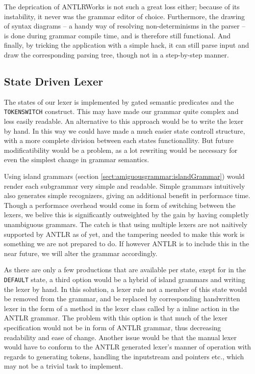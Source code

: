 The deprication of ANTLRWorks is not such a great loss either; because of its instability, it never was the grammar editor of choice. Furthermore, the drawing of syntax diagrams -- a handy way of resolving non-determinisms in the parser -- is done during grammar compile time, and is therefore still functional. And finally, by tricking the application with a simple hack, it can still parse input and draw the corresponding parsing tree, though not in a step-by-step manner.

\subsection{State Driven Lexer}

The states of our lexer is implemented by gated semantic predicates and the \verb!TOKENSWITCH! construct. This may have made our grammar quite complex and less easily readable. An alternative to this approach would be to write the lexer by hand. In this way we could have made a much easier state controll structure, with a more complete division between each states functionallity. But future modificatibility would be a problem, as a lot rewriting would be necessary for even the simplest change in grammar semantics.

Using island grammars (section \ref{sect:amiguousgrammar:islandGrammar}) would render each subgrammar very simple and readable. Simple grammars intuitively also generates simple recognizers, giving an additional benefit in performace time. Though a performace overhead would come in form of switching between the lexers, we belive this is significantly outweighted by the gain by having completly unambiguous grammars. The catch is that using multiple lexers are not naitively supported by ANTLR as of yet, and the tampering needed to make this work is something we are not prepared to do. If however ANTLR is to include this in the near future, we will alter the grammar accordingly.

As there are only a few productions that are available per state, exept for in the \verb!DEFAULT! state, a third option would be a hybrid of island grammars and writing the lexer by hand. In this solution, a lexer rule not a member of this state would be removed from the grammar, and be replaced by corresponding handwritten lexer in the form of a method in the lexer class called by a inline action in the ANTLR grammar. The problem with this option is that much of the lexer specification would not be in form of ANTLR grammar, thus decreasing readability and ease of change. Another issue would be that the manual lexer would have to conform to the ANTLR generated lexer's manner of operation with regards to generating tokens, handling the inputstream and pointers etc., which may not be a trivial task to implement.